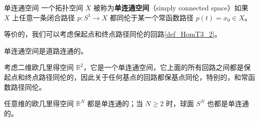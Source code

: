 

\begin{definition}{单连通空间}\label{def_SmpCn_1}
一个拓扑空间 $X$ 被称为\textbf{单连通空间}（simply connected space）如果 $X$ 上任意一条闭合路径 $p: S^1 \to X$ 都同伦于某一个常函数路径 $p(t) = x_0 \in X$。
\end{definition}

等价的，我们可以考虑保起点和终点路径同伦的回路\autoref{def_HomT3_2}。

\begin{theorem}{}
单连通空间是道路连通的。
\end{theorem}

\begin{example}{}
考虑二维欧几里得空间 $\mathbb{R}^2$，它是一个单连通空间，它上面的所有回路之间都是保起点和终点路径同伦的，因此关于任何基点的回路都保基点同伦，特别的，和常函数路径同伦。

任意维的欧几里得空间 $\mathbb{R}^N$ 都是单连通的；当 $N \geq 2$ 时，球面 $S^N$ 也都是单连通的。
\end{example}
